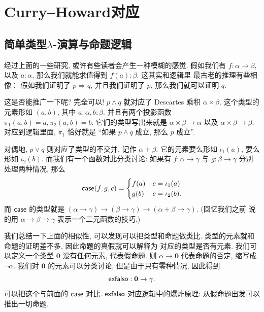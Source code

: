 \chapter{Curry--Howard对应} %
\section{简单类型\texorpdfstring{\(\lambda\)}{Lambda}-演算与命题逻辑}

经过上面的一些研究, 或许有些读者会产生一种模糊的感觉.
假如我们有 \(f : \alpha \to \beta\), 以及 \(a : \alpha\),
那么我们就能求值得到 \(f(a) : \beta\). 这其实和逻辑里
最古老的推理有些相像： 假如我们证明了 \(p\Rightarrow q\),
并且我们证明了 \(p\), 那么我们就可以证明 \(q\).

这是否能推广一下呢? 完全可以! \(p \wedge q\) 就对应了
Descartes 乘积 \(\alpha \times \beta\). 这个类型的
元素形如 \((a, b)\), 其中 \(a : \alpha, b : \beta\).
并且有两个投影函数 \(\pi_1(a, b) = a, \pi_2(a, b) = b\).
它们的类型写出来就是 \(\alpha \times\beta \to \alpha\)
以及 \(\alpha\times\beta \to \beta\). 对应到逻辑里面, \(\pi_1\)
恰好就是 “如果 \(p \wedge q\) 成立, 那么 \(p\) 成立”.

对偶地, \(p\vee q\) 则对应了类型的不交并, 记作
\(\alpha + \beta\). 它的元素要么形如 \(\iota_1(a)\),
要么形如 \(\iota_2(b)\). 而我们有一个函数对此分类讨论:
如果有 \(f : \alpha \to \gamma\) 与 \(g : \beta \to \gamma\)
分别处理两种情况, 那么
\[\textsf{case}(f,g,c) = \begin{cases}
  f(a) & c = \iota_1(a)\\
  g(b) & c = \iota_2(b).
\end{cases}\]
而 \(\textsf{case}\) 的类型就是
\((\alpha \to \gamma) \to (\beta \to \gamma)
\to (\alpha + \beta \to \gamma)\). (回忆我们之前
说的用 \(\alpha \to \beta\to \gamma\) 表示一个二元函数的技巧.)

我们总结一下上面的相似性, 可以发现可以把类型和命题做类比.
类型的元素就和命题的证明差不多, 因此命题的真假就可以解释为
对应的类型是否有元素. 我们可以定义一个类型 \(\mathbf 0\)
没有任何元素, 代表假命题. 则 \(\alpha \to \mathbf 0\)
代表命题的否定, 缩写成 \(\neg \alpha\). 我们对 \(\mathbf 0\)
的元素可以分类讨论, 但是由于只有零种情况, 因此得到
\[\textsf{exfalso} : \mathbf 0 \to \gamma.\]
可以把这个与前面的 \(\textsf{case}\) 对比. \(\textsf{exfalso}\)
对应逻辑中的爆炸原理: 从假命题出发可以推出一切命题.

